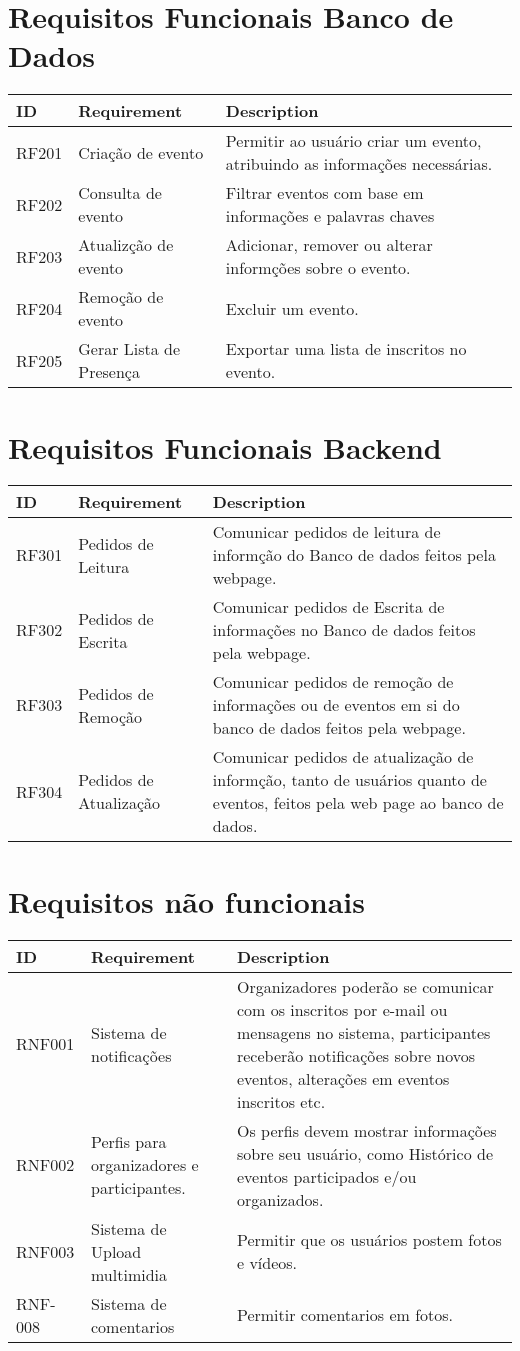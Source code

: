 \section{Requisitos Funcionais Banco de Dados}
\begin{tabular}{>{\raggedright}p{1.5cm}>{\raggedright}p{4cm}>{\raggedright}p{10cm}}
\toprule
\textbf{ID} & \textbf{Requirement} & \textbf{Description} \tabularnewline 
\midrule
  RF201 & Criação de evento & Permitir ao usuário criar um evento, atribuindo as informações necessárias.\tabularnewline \hline
  RF202 & Consulta de evento & Filtrar eventos com base em informações e palavras chaves\tabularnewline \hline
  RF203 & Atualizção de evento & Adicionar, remover ou alterar informções sobre o evento.\tabularnewline \hline
  RF204 & Remoção de evento & Excluir um evento.\tabularnewline \hline
  RF205 & Gerar Lista de Presença & Exportar uma lista de inscritos no evento.\tabularnewline 
\bottomrule
\end{tabular}

\section{Requisitos Funcionais Backend}

\begin{tabular}{>{\raggedright}p{1.5cm}>{\raggedright}p{4cm}>{\raggedright}p{10cm}}
\toprule
\textbf{ID} & \textbf{Requirement} & \textbf{Description} \tabularnewline 
\midrule
  RF301 & Pedidos de Leitura & Comunicar pedidos de leitura de informção do Banco de dados feitos pela webpage. \tabularnewline \hline
  RF302 & Pedidos de Escrita & Comunicar pedidos de Escrita de informações no Banco de dados feitos pela webpage.\tabularnewline \hline
  RF303 & Pedidos de Remoção & Comunicar pedidos de remoção de informações ou de eventos em si do banco de dados feitos pela webpage.\tabularnewline \hline
  RF304 & Pedidos de Atualização & Comunicar pedidos de atualização de informção, tanto de usuários quanto de eventos, feitos pela web page ao banco de dados.\tabularnewline 
\bottomrule
\end{tabular}


\section{Requisitos não funcionais}
\begin{tabular}{>{\raggedright}p{1.5cm}>{\raggedright}p{4cm}>{\raggedright}p{10cm}}
\toprule
\textbf{ID} & \textbf{Requirement} & \textbf{Description} \tabularnewline 
\midrule
RNF001 & Sistema de notificações & Organizadores poderão se comunicar com os inscritos por e-mail ou mensagens no sistema, participantes receberão notiﬁcações sobre novos eventos, alterações em eventos inscritos etc. \tabularnewline \hline
RNF002 & Perﬁs para organizadores e participantes. & Os perfis devem mostrar informações sobre seu usuário, como Histórico de eventos participados e/ou organizados. \tabularnewline \hline
RNF003 & Sistema de Upload multimidia & Permitir que os usuários postem fotos e vídeos. \tabularnewline \hline 
RNF-008 & Sistema de comentarios & Permitir comentarios em fotos.\tabularnewline

\bottomrule
\end{tabular}


